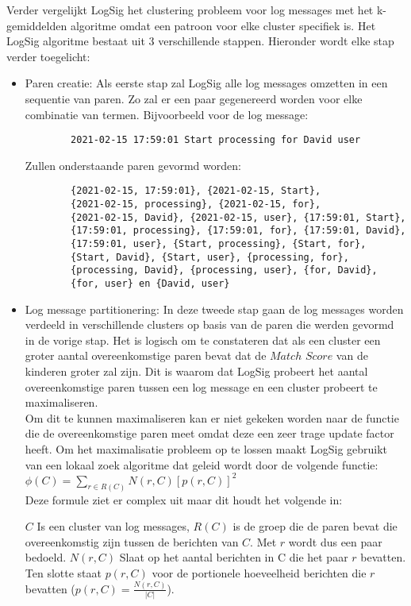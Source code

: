 Verder vergelijkt LogSig het clustering probleem voor log messages met het k-gemiddelden algoritme omdat een patroon voor elke cluster specifiek is. Het LogSig algoritme bestaat uit 3 verschillende stappen. Hieronder wordt elke stap verder toegelicht:
\begin{itemize}
    \item Paren creatie: Als eerste stap zal LogSig alle log messages omzetten in een sequentie van paren. Zo zal er een paar gegenereerd worden voor elke combinatie van termen. Bijvoorbeeld voor de log message:
    \begin{verbatim}
        2021-02-15 17:59:01 Start processing for David user
    \end{verbatim}
    Zullen onderstaande paren gevormd worden:
    \begin{verbatim}
        {2021-02-15, 17:59:01}, {2021-02-15, Start}, 
        {2021-02-15, processing}, {2021-02-15, for}, 
        {2021-02-15, David}, {2021-02-15, user}, {17:59:01, Start}, 
        {17:59:01, processing}, {17:59:01, for}, {17:59:01, David}, 
        {17:59:01, user}, {Start, processing}, {Start, for},
        {Start, David}, {Start, user}, {processing, for},
        {processing, David}, {processing, user}, {for, David},
        {for, user} en {David, user}
    \end{verbatim}
    
    \item Log message partitionering: In deze tweede stap gaan de log messages worden verdeeld in verschillende clusters op basis van de paren die werden gevormd in de vorige stap. Het is logisch om te constateren dat als een cluster een groter aantal overeenkomstige paren bevat dat de $Match$ $Score$ van de kinderen groter zal zijn. Dit is waarom dat LogSig probeert het aantal overeenkomstige paren tussen een log message en een cluster probeert te maximaliseren.\\
    Om dit te kunnen maximaliseren kan er niet gekeken worden naar de functie die de overeenkomstige paren meet omdat deze een zeer trage update factor heeft. Om het maximalisatie probleem op te lossen maakt LogSig gebruikt van een lokaal zoek algoritme dat geleid wordt door de volgende functie:\\
    \(\phi(C) = \sum_{r \in R(C)} N(r, C)[p(r, C)]^2\)\\
    Deze formule ziet er complex uit maar dit houdt het volgende in:
    
    \subitem $C$ Is een cluster van log messages, $R(C)$ is de groep die de paren bevat die overeenkomstig zijn tussen de berichten van $C$. Met $r$ wordt dus een paar bedoeld. $N(r,C)$ Slaat op het aantal berichten in C die het paar $r$ bevatten. Ten slotte staat $p(r,C)$ voor de portionele hoeveelheid berichten die $r$ bevatten (\(p(r,C) = \frac{N(r,C)}{\lvert C \rvert}\)).
    

\end{itemize}
